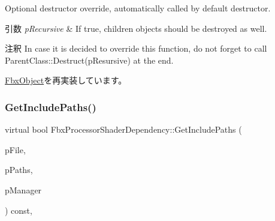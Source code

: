 Optional destructor override, automatically called by default destructor. 
\begin{DoxyParams}{引数}
{\em p\+Recursive} & If true, children objects should be destroyed as well. \\
\hline
\end{DoxyParams}
\begin{DoxyRemark}{注釈}
In case it is decided to override this function, do not forget to call Parent\+Class\+::\+Destruct(p\+Resursive) at the end. 
\end{DoxyRemark}


\hyperlink{class_fbx_object_a123e084d9b32b29c28af6384b7c3c608}{Fbx\+Object}を再実装しています。

\mbox{\label{class_fbx_processor_shader_dependency_a41473d93802b3f628bede8dad500d42c}} 
\subsubsection{\texorpdfstring{Get\+Include\+Paths()}{GetIncludePaths()}}
{\footnotesize\ttfamily virtual bool Fbx\+Processor\+Shader\+Dependency\+::\+Get\+Include\+Paths (\begin{DoxyParamCaption}\item[{\hyperlink{class_fbx_string}{Fbx\+String} \&}]{p\+File,  }\item[{\hyperlink{class_fbx_processor_shader_dependency_a52e467804857e767f194d73000b08f39}{File\+Path\+List} \&}]{p\+Paths,  }\item[{\hyperlink{class_fbx_x_ref_manager}{Fbx\+X\+Ref\+Manager} \&}]{p\+Manager }\end{DoxyParamCaption}) const\hspace{0.3cm}{\ttfamily [protected]}, {\ttfamily [virtual]}}

\mbox{\label{class_fbx_processor_shader_dependency_a4e6d8ee3e0abd220aeeba254f848f147}} 
